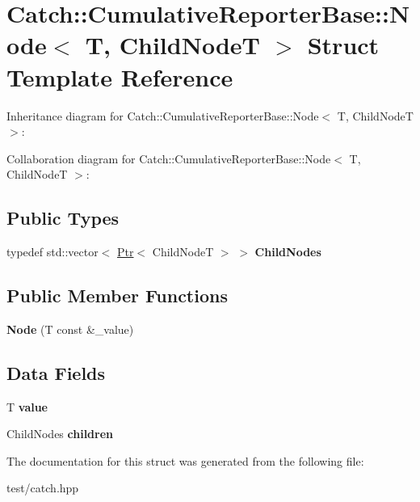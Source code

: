 \hypertarget{structCatch_1_1CumulativeReporterBase_1_1Node}{}\section{Catch\+:\+:Cumulative\+Reporter\+Base\+:\+:Node$<$ T, Child\+NodeT $>$ Struct Template Reference}
\label{structCatch_1_1CumulativeReporterBase_1_1Node}


Inheritance diagram for Catch\+:\+:Cumulative\+Reporter\+Base\+:\+:Node$<$ T, Child\+NodeT $>$\+:


Collaboration diagram for Catch\+:\+:Cumulative\+Reporter\+Base\+:\+:Node$<$ T, Child\+NodeT $>$\+:
\subsection*{Public Types}
\begin{DoxyCompactItemize}
\item 
typedef std\+::vector$<$ \hyperlink{classCatch_1_1Ptr}{Ptr}$<$ Child\+NodeT $>$ $>$ {\bfseries Child\+Nodes}\hypertarget{structCatch_1_1CumulativeReporterBase_1_1Node_ad410701d72466c05acf86956aabafaf1}{}\label{structCatch_1_1CumulativeReporterBase_1_1Node_ad410701d72466c05acf86956aabafaf1}

\end{DoxyCompactItemize}
\subsection*{Public Member Functions}
\begin{DoxyCompactItemize}
\item 
{\bfseries Node} (T const \&\+\_\+value)\hypertarget{structCatch_1_1CumulativeReporterBase_1_1Node_afff50af7c9f08e9fef089baa7c948096}{}\label{structCatch_1_1CumulativeReporterBase_1_1Node_afff50af7c9f08e9fef089baa7c948096}

\end{DoxyCompactItemize}
\subsection*{Data Fields}
\begin{DoxyCompactItemize}
\item 
T {\bfseries value}\hypertarget{structCatch_1_1CumulativeReporterBase_1_1Node_ac028cad2accba6cac30b92619bc8cfa0}{}\label{structCatch_1_1CumulativeReporterBase_1_1Node_ac028cad2accba6cac30b92619bc8cfa0}

\item 
Child\+Nodes {\bfseries children}\hypertarget{structCatch_1_1CumulativeReporterBase_1_1Node_a7b123f17f6b77f5cd4e2f9c1325515a4}{}\label{structCatch_1_1CumulativeReporterBase_1_1Node_a7b123f17f6b77f5cd4e2f9c1325515a4}

\end{DoxyCompactItemize}


The documentation for this struct was generated from the following file\+:\begin{DoxyCompactItemize}
\item 
test/catch.\+hpp\end{DoxyCompactItemize}
